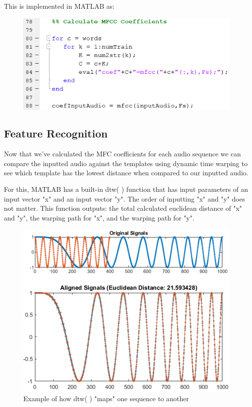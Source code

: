 \documentclass{article}
\begin{document}
This is implemented in MATLAB as:

\begin{figure}[H]
    \centering
    \includegraphics[width=\linewidth]{MATLAB_mfcc2.png}
    \caption{}
    \label{fig:MATLAB_mfcc2}
\end{figure}

\subsection{Feature Recognition}
Now that we've calculated the MFC coefficients for each audio sequence we can compare the inputted audio against the templates using dynamic time warping to see which template has the lowest distance when compared to our inputted audio.

For this, MATLAB has a built-in dtw( ) function that has input parameters of an input vector "x" and an input vector "y". The order of inputting "x" and "y" does not matter. This function outputs: the total calculated euclidean distance of "x" and "y", the warping path for "x", and the warping path for "y".

\begin{figure}[H]
    \centering
    \includegraphics[width=\linewidth]{dtw_docu.png}
    \caption{Example of how dtw( ) "maps" one sequence to another}
    \label{fig:MATLAB_dtw_docu}
\end{figure}
\end{document}
